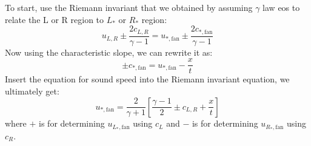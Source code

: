 To start, use the Riemann invariant that we obtained by assuming $\gamma$ law eos to relate
the L or R region to $L_*$ or $R_*$ region:
\begin{equation}
u_{L,R} \pm \frac{2c_{L,R}}{\gamma - 1} = u_{*,\mathrm{fan}} \pm \frac{2c_{*,\mathrm{fan}}}{\gamma - 1}
\end{equation}
Now using the characteristic slope, we can rewrite it as:
\begin{equation}
\pm c_{*,\mathrm{fan}} = u_{*,\mathrm{fan}} - \frac{x}{t}
\end{equation}
Insert the equation for sound speed into the Riemann invariant equation, we ultimately get:
\begin{equation}
u_{*,\mathrm{fan}} = \frac{2}{\gamma + 1} \left[ \frac{\gamma - 1}{2} \pm c_{L,R} + \frac{x}{t}\right]
\end{equation}
where $+$ is for determining $u_{L_*,\mathrm{fan}}$ using $c_L$ and
$-$ is for determining $u_{R_*,\mathrm{fan}}$ using $c_R$.

